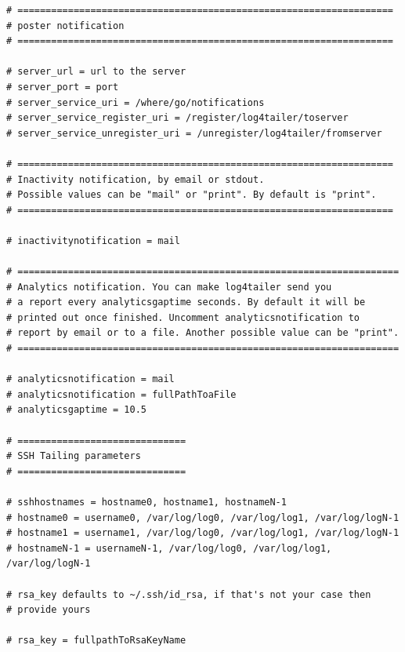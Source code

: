 \begin{verbatim}
# ===================================================================
# poster notification
# ===================================================================

# server_url = url to the server
# server_port = port
# server_service_uri = /where/go/notifications
# server_service_register_uri = /register/log4tailer/toserver
# server_service_unregister_uri = /unregister/log4tailer/fromserver

# ===================================================================
# Inactivity notification, by email or stdout.
# Possible values can be "mail" or "print". By default is "print".
# ===================================================================

# inactivitynotification = mail

# ====================================================================
# Analytics notification. You can make log4tailer send you 
# a report every analyticsgaptime seconds. By default it will be 
# printed out once finished. Uncomment analyticsnotification to 
# report by email or to a file. Another possible value can be "print".
# ====================================================================

# analyticsnotification = mail
# analyticsnotification = fullPathToaFile
# analyticsgaptime = 10.5

# ==============================
# SSH Tailing parameters
# ==============================

# sshhostnames = hostname0, hostname1, hostnameN-1
# hostname0 = username0, /var/log/log0, /var/log/log1, /var/log/logN-1
# hostname1 = username1, /var/log/log0, /var/log/log1, /var/log/logN-1
# hostnameN-1 = usernameN-1, /var/log/log0, /var/log/log1, /var/log/logN-1

# rsa_key defaults to ~/.ssh/id_rsa, if that's not your case then 
# provide yours

# rsa_key = fullpathToRsaKeyName 

\end{verbatim}

\newpage
